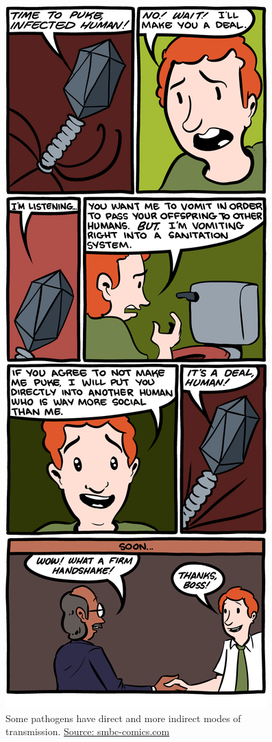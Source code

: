 \documentclass[]{book}
\theoremstyle{definition}
\theoremstyle{definition}
\theoremstyle{definition}
\theoremstyle{remark}
\begin{document}
\begin{figure}
\centering
\includegraphics{./images/smbctransmissionmode.png}
\caption{Some pathogens have direct and more indirect modes of
transmission. \href{http://www.smbc-comics.com/}{Source:
smbc-comics.com}}
\end{figure}
\end{document}
